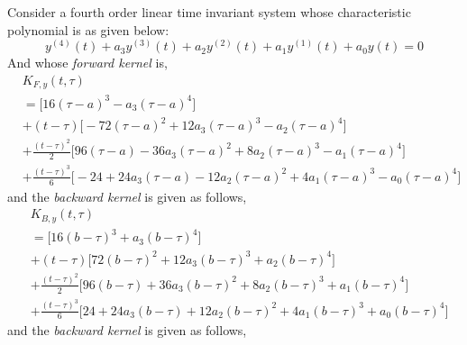\documentclass{article}
\begin{document}
Consider a fourth order linear time invariant system whose characteristic polynomial is as given below:
\begin{equation}\label{eqn.100}
y^{(4)}(t) + a_{3}y^{(3)}(t) + a_{2}y^{(2)}(t) + a_{1}y^{(1)}(t) + a_{0}y(t) = 0
\end{equation}
And whose \textit{forward kernel} is,
\begin{equation}\label{eqn.101}
\begin{split}
	& K_{F,y}(t,\tau)\\
	&=\bigg[16(\tau-a)^{3}-a_3(\tau-a)^{4}\bigg]\\
	&+(t-\tau)\bigg[-72(\tau-a)^2 + 12a_3(\tau-a)^3 - a_2(\tau-a)^4\bigg]\\
	&+\frac{(t-\tau)^2}{2}\bigg[96(\tau-a) - 36a_3(\tau-a)^2 + 8a_2(\tau-a)^3 -a_1(\tau-a)^4\bigg]\\
	&+\frac{(t-\tau)^3}{6}\bigg[-24 + 24a_3(\tau-a) - 12a_2(\tau-a)^2 + 4a_1(\tau-a)^3 - a_0(\tau-a)^4\bigg]	
\end{split}
\end{equation}
and the \textit{backward kernel} is given as follows,
\begin{equation}\label{eqn.102}
\begin{split}
	&K_{B,y}(t,\tau)\\
	&=\bigg[16(b-\tau)^{3} + a_3(b-\tau)^{4}\bigg]\\
	&+(t-\tau)\bigg[72(b-\tau)^{2} + 12a_3(b-\tau)^{3} + a_2(b-\tau)^{4}\bigg]\\
	&+\frac{(t-\tau)^{2}}{2}\bigg[96(b-\tau)+36a_3(b-\tau)^{2} + 8a_2(b-\tau)^{3} + a_1(b-\tau)^{4}\bigg]\\
	&+\frac{(t-\tau)^{3}}{6}\bigg[24+24a_3(b-\tau)+12a_2(b-\tau)^{2}+4a_1(b-\tau)^{3}+a_0(b-\tau)^{4}\bigg]
\end{split}
\end{equation}
and the \textit{backward kernel} is given as follows,
\end{document}
